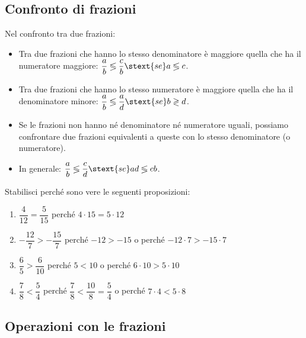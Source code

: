 \subsection{Confronto di frazioni}
\label{sub:razionali_confronto}

\begin{definizione}{}{}
Nel confronto tra due frazioni:

\begin{itemize} [noitemsep]
\item Tra due frazioni che hanno lo stesso 
denominatore è maggiore quella 
che ha il numeratore maggiore: 
\(\dfrac{a}{b} \lessgtr \dfrac{c}{b} \stext{se} a \lessgtr c\).
\item Tra due frazioni che hanno lo stesso numeratore è maggiore quella 
che ha il denominatore minore: 
\(\dfrac{a}{b} \lessgtr \dfrac{a}{d} \stext{se} b \gtrless d\).
\item Se le frazioni non hanno né denominatore né numeratore uguali, 
possiamo confrontare due frazioni equivalenti a queste con lo stesso 
denominatore (o numeratore).
\item In generale: 
\(\dfrac{a}{b} \lessgtr \dfrac{c}{d} \stext{se} ad \lessgtr cb\).
\end{itemize}
\end{definizione}

\begin{esempi}{}{}
Stabilisci perché sono vere le seguenti proposizioni:
\begin{enumerate} [noitemsep]
\spazielenx
\item \(\dfrac{4}{12} = \dfrac{5}{15}\) \qquad perché 
\(4 \cdot 15 = 5 \cdot 12\) 
\item \(-\dfrac{12}{7} > -\dfrac{15}{7}\) \qquad perché 
\(-12 > -15\) \quad o perché \quad 
\(-12 \cdot 7 > -15 \cdot 7\)
\item \(\dfrac{6}{5} > \dfrac{6}{10}\) \qquad  perché 
\(5 < 10\) \quad o perché \quad 
\(6 \cdot 10 > 5 \cdot 10\)
\item \(\dfrac{7}{8} < \dfrac{5}{4}\) \qquad perché 
\(\dfrac{7}{8} < \dfrac{10}{8} = \dfrac{5}{4}\) \quad o perché \quad 
\(7 \cdot 4 < 5 \cdot 8\)
\end{enumerate}
\end{esempi}

\subsection{Operazioni con le frazioni}
\label{sub:razionali_operazioni}


